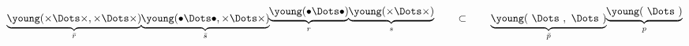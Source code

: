 \begin{equation}
\underbrace{\young(\times\Dots\times,\times\Dots\times)}_{\bar r}\kern -2.3pt
\underbrace{\young(\bullet\Dots\bullet,\times\Dots\times)}_{\bar s}\kern -2.5pt
\raise 6.7pt \hbox{$\underbrace{\young(\bullet \Dots \bullet )}_{r}\kern -2pt
\underbrace{\young(\times \Dots \times )}_{s}$}
\qquad\subset\qquad
\underbrace{\young(\ \Dots \ ,\ \Dots \ )}_{\bar p}\kern -2.2pt
\raise 6.7pt\hbox{$\underbrace{\young(\ \Dots \ )}_{p}$}
\end{equation}

